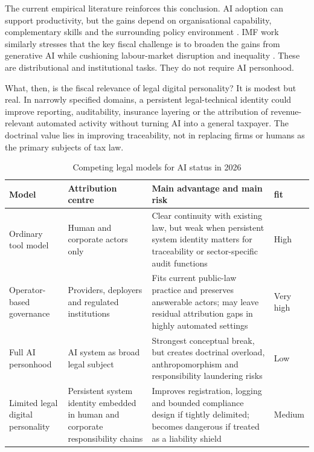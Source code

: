 \documentclass[11pt]{article}
\begin{document}
The current empirical literature reinforces this conclusion. AI adoption can support productivity, but the gains depend on organisational capability, complementary skills and the surrounding policy environment \citep{oecd2025adoption,oecd2025sme,wef2025jobs}. IMF work similarly stresses that the key fiscal challenge is to broaden the gains from generative AI while cushioning labour-market disruption and inequality \citep{brollo2024}. These are distributional and institutional tasks. They do not require AI personhood.

What, then, is the fiscal relevance of legal digital personality? It is modest but real. In narrowly specified domains, a persistent legal-technical identity could improve reporting, auditability, insurance layering or the attribution of revenue-relevant automated activity without turning AI into a general taxpayer. The doctrinal value lies in improving traceability, not in replacing firms or humans as the primary subjects of tax law.

\begin{table}[htbp]
\centering
\small
\caption{Competing legal models for AI status in 2026}
\begin{tabularx}{\textwidth}{>{\raggedright\arraybackslash}p{3cm} >{\raggedright\arraybackslash}p{3.2cm} X >{\centering\arraybackslash}p{1.6cm}}
\toprule
Model & Attribution centre & Main advantage and main risk & 2026 fit \\
\midrule
Ordinary tool model & Human and corporate actors only & Clear continuity with existing law, but weak when persistent system identity matters for traceability or sector-specific audit functions & High \\
Operator-based governance & Providers, deployers and regulated institutions & Fits current public-law practice and preserves answerable actors; may leave residual attribution gaps in highly automated settings & Very high \\
Full AI personhood & AI system as broad legal subject & Strongest conceptual break, but creates doctrinal overload, anthropomorphism and responsibility laundering risks & Low \\
Limited legal digital personality & Persistent system identity embedded in human and corporate responsibility chains & Improves registration, logging and bounded compliance design if tightly delimited; becomes dangerous if treated as a liability shield & Medium \\
\bottomrule
\end{tabularx}
\end{table}
\end{document}
